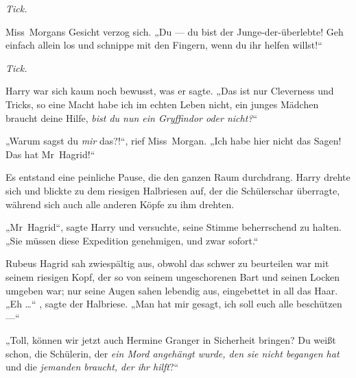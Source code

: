 \emph{Tick.}

Miss~Morgans Gesicht verzog sich.
„Du — du bist der Junge-der-überlebte! Geh einfach allein los und schnippe mit den Fingern, wenn du ihr helfen willst!“

\emph{Tick.}

Harry war sich kaum noch bewusst, was er sagte.
„Das ist nur Cleverness und Tricks, so eine Macht habe ich im echten Leben nicht, ein junges Mädchen braucht deine Hilfe, \emph{bist du nun ein Gryffindor oder nicht?}“

„Warum sagst du \emph{mir} das?!“, rief Miss~Morgan.
„Ich habe hier nicht das Sagen! Das hat Mr~Hagrid!“


Es entstand eine peinliche Pause, die den ganzen Raum durchdrang. Harry drehte sich und blickte zu dem riesigen Halbriesen auf, der die Schülerschar überragte, während sich auch alle anderen Köpfe zu ihm drehten.

„Mr~Hagrid“, sagte Harry und versuchte, seine Stimme beherrschend zu halten.
„Sie müssen diese Expedition genehmigen, und zwar sofort.“

Rubeus Hagrid sah zwiespältig aus, obwohl das schwer zu beurteilen war mit seinem riesigen Kopf, der so von seinem ungeschorenen Bart und seinen Locken umgeben war; nur seine Augen sahen lebendig aus, eingebettet in all das Haar.
„Eh …“ , sagte der Halbriese.
„Man hat mir gesagt, ich soll euch alle beschützen —“

„Toll, können wir jetzt auch Hermine Granger in Sicherheit bringen? Du weißt schon, die Schülerin, der \emph{ein Mord angehängt wurde, den sie nicht begangen hat} und die \emph{jemanden braucht, der ihr hilft}?“

